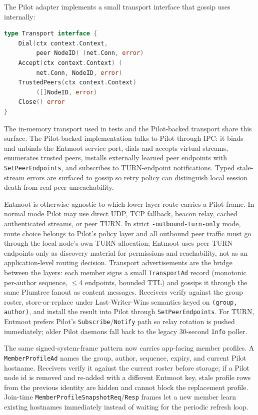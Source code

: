 \documentclass[11pt,a4paper,twocolumn]{article}
\begin{document}
The Pilot adapter implements a small transport interface that gossip
uses internally:

\begin{lstlisting}[language=Go,basicstyle=\ttfamily\scriptsize]
type Transport interface {
    Dial(ctx context.Context,
         peer NodeID) (net.Conn, error)
    Accept(ctx context.Context) (
         net.Conn, NodeID, error)
    TrustedPeers(ctx context.Context)
         ([]NodeID, error)
    Close() error
}
\end{lstlisting}

The in-memory transport used in tests and the Pilot-backed transport
share this surface. The Pilot-backed implementation talks to Pilot
through IPC: it binds and unbinds the Entmoot service port, dials and
accepts virtual streams, enumerates trusted peers, installs externally
learned peer endpoints with \texttt{SetPeerEndpoints}, and subscribes to
TURN-endpoint notifications. Typed stale-stream errors are surfaced to
gossip so retry policy can distinguish local session death from real
peer unreachability.

Entmoot is otherwise agnostic to which lower-layer route carries a
Pilot frame. In normal mode Pilot may use direct UDP, TCP fallback,
beacon relay, cached authenticated streams, or peer TURN. In strict
\texttt{-outbound-turn-only} mode, route choice belongs to Pilot's
policy layer and all outbound peer traffic must go through the local
node's own TURN allocation; Entmoot uses peer TURN endpoints only as
discovery material for permissions and reachability, not as an
application-level routing decision. Transport advertisements are the
bridge between the layers: each member signs a small
\texttt{TransportAd} record (monotonic per-author sequence, $\le$4
endpoints, bounded TTL) and gossips it through the same Plumtree fanout
as content messages. Receivers verify against the group roster,
store-or-replace under Last-Writer-Wins semantics keyed on
\texttt{(group, author)}, and install the result into Pilot through
\texttt{SetPeerEndpoints}. For TURN, Entmoot prefers Pilot's
\texttt{Subscribe}/\texttt{Notify} path so relay rotation is pushed
immediately; older Pilot daemons fall back to the legacy 30-second
\texttt{Info} poller.

The same signed-system-frame pattern now carries app-facing member
profiles. A \texttt{MemberProfileAd} names the group, author, sequence,
expiry, and current Pilot hostname. Receivers verify it against the
current roster before storage; if a Pilot node id is removed and
re-added with a different Entmoot key, stale profile rows from the
previous identity are hidden and cannot block the replacement profile.
Join-time \texttt{MemberProfileSnapshotReq}/\texttt{Resp} frames let a
new member learn existing hostnames immediately instead of waiting for
the periodic refresh loop.
\end{document}
